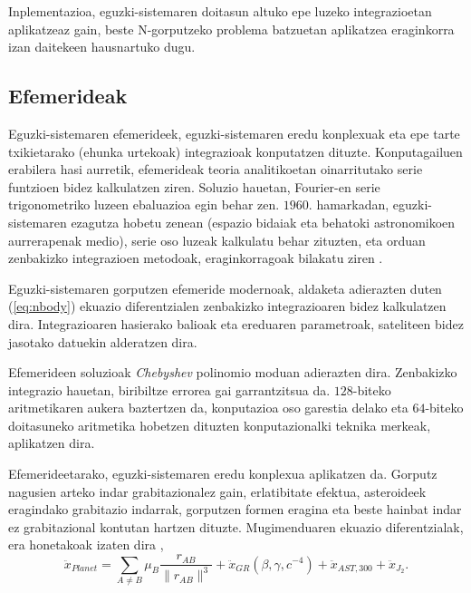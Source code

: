 Inplementazioa, eguzki-sistemaren doitasun altuko epe luzeko integrazioetan aplikatzeaz gain, beste N-gorputzeko problema batzuetan aplikatzea eraginkorra izan daitekeen hausnartuko dugu. 

\subsection*{Efemerideak}

Eguzki-sistemaren  efemerideek, eguzki-sistemaren eredu konplexuak eta epe tarte txikietarako (ehunka urtekoak) integrazioak konputatzen dituzte. Konputagailuen erabilera hasi aurretik, efemerideak teoria analitikoetan oinarritutako serie funtzioen bidez kalkulatzen ziren. Soluzio hauetan, Fourier-en serie trigonometriko luzeen ebaluazioa egin behar zen. $1960.$ hamarkadan, eguzki-sistemaren ezagutza hobetu zenean (espazio bidaiak eta behatoki astronomikoen aurrerapenak medio), serie oso luzeak kalkulatu behar zituzten, eta orduan zenbakizko integrazioen metodoak, eraginkorragoak bilakatu ziren \cite{Kaplan2015}.   
   
Eguzki-sistemaren gorputzen efemeride modernoak, aldaketa adierazten duten (\ref{eq:nbody})  ekuazio diferentzialen  zenbakizko integrazioaren bidez kalkulatzen dira. Integrazioaren hasierako balioak eta ereduaren parametroak, sateliteen bidez jasotako datuekin alderatzen dira.

Efemerideen soluzioak \emph{Chebyshev} polinomio moduan adierazten dira. Zenbakizko integrazio hauetan, biribiltze errorea gai garrantzitsua da. $128$-biteko aritmetikaren aukera baztertzen da, konputazioa oso garestia delako eta $64$-biteko doitasuneko aritmetika hobetzen dituzten  konputazionalki teknika merkeak, aplikatzen dira. 

Efemerideetarako, eguzki-sistemaren eredu konplexua aplikatzen da. Gorputz nagusien arteko indar grabitazionalez gain, erlatibitate efektua, asteroideek eragindako grabitazio indarrak, gorputzen formen eragina eta beste hainbat indar ez grabitazional kontutan hartzen dituzte. Mugimenduaren ekuazio diferentzialak, era honetakoak izaten dira \cite{Feinga2015},      
      \begin{equation*}
      \ddot{x}_{Planet}= \sum_{A \neq B} \mu_B \frac{r_{AB}}{\|r_{AB}\|^3}+\ddot{x}_{GR} (\beta,\gamma,c^{-4})+ \ddot{x}_{AST,300}+ \ddot{x}_{J_2}.
      \end{equation*}

